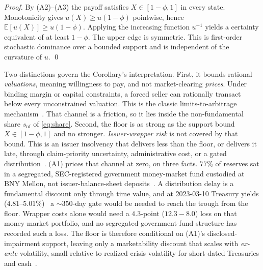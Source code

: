 \begin{proof}
By (A2)--(A3) the payoff satisfies $X\in[1-\phi,1]$ in every state. Monotonicity gives
$u(X)\ge u(1-\phi)$ pointwise, hence $\mathbb{E}[u(X)]\ge u(1-\phi)$. Applying the
increasing function $u^{-1}$ yields a certainty equivalent of at least $1-\phi$. The upper
edge is symmetric. This is first-order stochastic dominance over a bounded support and is
independent of the curvature of $u$. \qed
\end{proof}

Two distinctions govern the Corollary's interpretation. First, it bounds rational
\emph{valuations}, meaning willingness to pay, and not market-clearing \emph{prices}. Under
binding margin or capital constraints, a forced seller can rationally transact below every
unconstrained valuation. This is the classic limits-to-arbitrage
mechanism~\cite{shleifervishny1997,grombvayanos2010}. That channel is a friction, so it lies
inside the non-fundamental share $s_{\mathrm{nf}}$ of \eqref{eq:share}. Second, the floor
is as strong as the support bound $X\in[1-\phi,1]$ and no stronger. \emph{Issuer-wrapper risk} is not covered by that bound. This is an issuer insolvency that delivers
less than the floor, or delivers it late, through claim-priority uncertainty, administrative
cost, or a gated distribution~\cite{Gorton_2021}. (A1) prices that channel at zero, on three
facts. $77\%$ of reserves sat in a segregated, SEC-registered government money-market
fund custodied at BNY Mellon, not issuer-balance-sheet deposits~\cite{circle2023update}. A distribution delay is a
fundamental discount only through time value, and at 2023-03-10 Treasury yields
($4.81$--$5.01\%$)~\cite{ustreasury2023daily} a $\sim\!350$-day gate would be needed to reach
the trough from the floor. Wrapper costs alone would need a $4.3$-point ($12.3-8.0$) loss on
that money-market portfolio, and no segregated government-fund structure has recorded such a
loss. The floor is therefore conditional on (A1)'s disclosed-impairment support, leaving only
a marketability discount that scales with \emph{ex-ante} volatility, small relative to
realized crisis volatility for short-dated Treasuries and cash~\cite{longstaff1995}.

